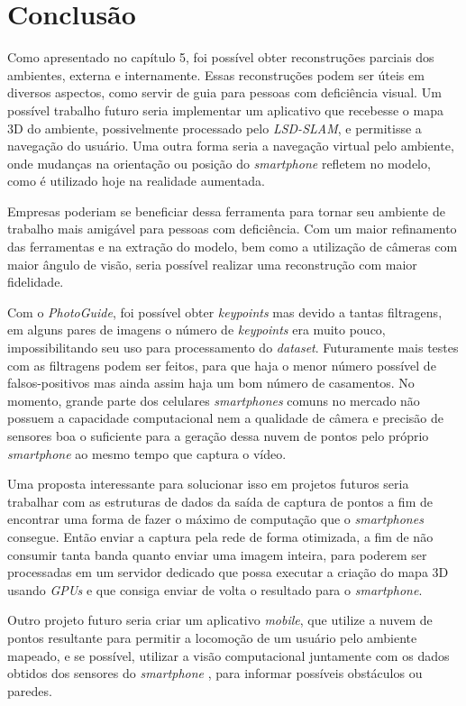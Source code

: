 \chapter{Conclusão}
Como apresentado no capítulo 5, foi possível obter reconstruções parciais dos ambientes, externa e internamente. Essas reconstruções podem ser úteis em diversos aspectos, como servir de guia para pessoas com deficiência visual. Um possível trabalho futuro seria implementar um aplicativo que recebesse o mapa 3D do ambiente, possivelmente processado pelo \textit{LSD-SLAM}, e permitisse a navegação do usuário. Uma outra forma seria a navegação virtual pelo ambiente, onde mudanças na orientação ou posição do \textit{smartphone} refletem no modelo, como é utilizado hoje na realidade aumentada.

Empresas poderiam se beneficiar dessa ferramenta para tornar seu ambiente de trabalho mais amigável para pessoas com deficiência. Com um maior refinamento das ferramentas e na extração do modelo, bem como a utilização de câmeras com maior ângulo de visão, seria possível realizar uma reconstrução com maior fidelidade. 

 Com o \textit{PhotoGuide}, foi possível obter \textit{keypoints} mas devido a tantas filtragens, em alguns pares de imagens o número de \textit{keypoints} era muito pouco, impossibilitando seu uso para processamento do \textit{dataset}. Futuramente mais testes com as filtragens podem ser feitos, para que haja o menor número possível de falsos-positivos mas ainda assim haja um bom número de casamentos. No momento, grande parte dos celulares \textit{smartphones} comuns no mercado não possuem a capacidade computacional nem a qualidade de câmera e precisão de sensores boa o suficiente para a geração dessa nuvem de pontos pelo próprio \textit{smartphone} ao mesmo tempo que captura o vídeo. 
 
 Uma proposta interessante para solucionar isso em projetos futuros seria trabalhar com as estruturas de dados da saída de captura de pontos a fim de encontrar uma forma de fazer o máximo de computação que o \textit{smartphones} consegue. Então enviar a captura pela rede de forma otimizada, a fim de não consumir tanta banda quanto enviar uma imagem inteira, para poderem ser processadas em um servidor dedicado que possa executar a criação do mapa 3D usando \textit{GPUs} e que consiga enviar de volta o resultado para o \textit{smartphone}.
	
Outro projeto futuro seria criar um aplicativo \textit{mobile}, que utilize a nuvem de pontos resultante para permitir a locomoção de um usuário pelo ambiente mapeado, e se possível, utilizar a visão computacional juntamente com os dados obtidos dos sensores do \textit{smartphone} , para informar possíveis obstáculos ou paredes.

